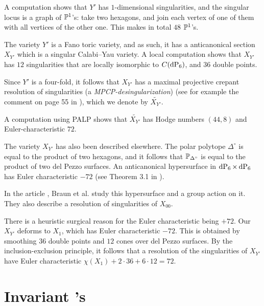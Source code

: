 A computation shows that $Y'$ has $1$-dimensional singularities, and the singular locus is a graph of $\P^1$'s: take two hexagons, and join each vertex of one of them with all vertices of the other one. This makes in total $48$ $\P^1$'s. 

The variety $Y'$ is a Fano toric variety, and as such, it has a anticanonical section $X_{Y'}$ which is a singular Calabi--Yau variety. A local computation shows that $X_{Y'}$ has $12$ singularities that are locally isomorphic to $C(\dP6)$, and $36$ double points.

Since $Y'$ is a four-fold, it follows that $X_{Y'}$ has a maximal projective crepant resolution of singularities (a \emph{MPCP-desingularization}) (see for example the comment on page 55 in \cite{mirrorsymmetry}), which we denote by $\widetilde{X_{Y'}}$.

A computation using PALP \cite{palp} shows that $\widetilde{X_{Y'}}$ has Hodge numbers $(44,8)$ and Euler-characteristic $72$. 

\begin{remark}
The variety $X_{Y'}$ has also been described elsewhere. The polar polytope $\Delta^{\circ}$ is equal to the product of two hexagons, and it follows that $\P_{\Delta^\circ}$ is equal to the product of two del Pezzo surfaces. An anticanonical hypersurface in $\dP6 \times \dP6$ has Euler characteristic $-72$ (see Theorem 3.1 in \cite{bestiary_hubsch}).

In the article \cite{braun_smallhodgenumbers}, Braun et al. study this hypersurface and a group action on it. They also describe a resolution of singularities of $X_{00}$.
\end{remark}

\begin{remark}
There is a heuristic surgical reason for the Euler characteristic being $+72$. Our $X_{Y'}$ deforms to $X_1$, which has Euler characteristic $-72$. This is obtained by smoothing $36$ double points and $12$ cones over del Pezzo surfaces. By the inclusion-exclusion principle, it follows that a resolution of the singularities of $X_{Y'}$ have Euler characteristic $\chi(X_1)+2\cdot 36 + 6 \cdot 12=72$.
\end{remark}



\section{Invariant \CY's}


